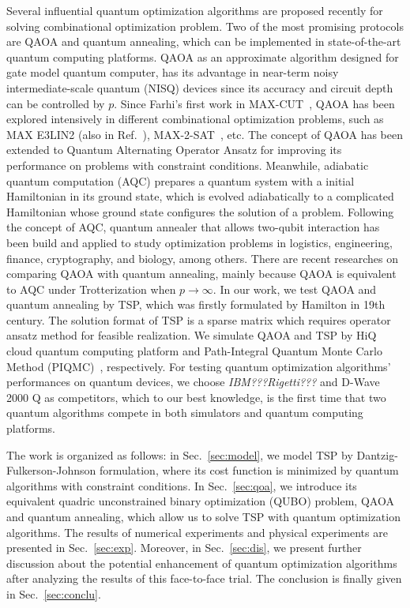 \documentclass[aps,pra,twocolumn,superscriptaddress]{revtex4-2}
\begin{document}
Several influential quantum optimization algorithms are proposed recently for solving combinational optimization problem. Two of the most promising protocols are QAOA and quantum annealing, which can be implemented in state-of-the-art quantum computing platforms. QAOA as an approximate algorithm designed for gate model quantum computer, has its advantage in near-term noisy intermediate-scale quantum (NISQ) devices since its accuracy and circuit depth can be controlled by $p$. Since Farhi's first work in MAX-CUT~\cite{maxcut}, QAOA has been explored intensively in different combinational optimization problems, such as MAX E3LIN2 (also in Ref.~\cite{maxcut}), MAX-2-SAT~\cite{max2sat}, etc. The concept of QAOA has been extended to Quantum Alternating Operator Ansatz for improving its performance on problems with constraint conditions. Meanwhile, adiabatic quantum computation (AQC) prepares a quantum system with a initial Hamiltonian in its ground state, which is evolved adiabatically to a complicated Hamiltonian whose ground state configures the solution of a problem. Following the concept of AQC, quantum annealer that allows two-qubit interaction has been build and applied to study optimization problems in logistics, engineering, finance, cryptography, and biology, among others. There are recent researches on comparing QAOA with quantum annealing, mainly because QAOA is equivalent to AQC under Trotterization when $p\rightarrow\infty$. In our work, we test QAOA and quantum annealing by TSP, which was firstly formulated by Hamilton in 19th century. The solution format of TSP is a sparse matrix which requires operator ansatz method for feasible realization. We simulate QAOA and TSP by HiQ cloud quantum computing platform and Path-Integral Quantum Monte Carlo Method (PIQMC)~\cite{path_integral}, respectively. For testing quantum optimization algorithms' performances on quantum devices, we choose \textit{IBM???Rigetti???} and D-Wave 2000 Q as competitors, which to our best knowledge, is the first time that two quantum algorithms compete in both simulators and quantum computing platforms.

The work is organized as follows: in Sec.~\ref{sec:model}, we model TSP by Dantzig-Fulkerson-Johnson formulation, where its cost function is minimized by quantum algorithms with constraint conditions. In Sec.~\ref{sec:qoa},  we introduce its equivalent quadric unconstrained binary optimization (QUBO) problem, QAOA and quantum annealing, which allow us to solve TSP with quantum optimization algorithms. The results of numerical experiments and physical experiments are presented in Sec.~\ref{sec:exp}. Moreover, in Sec.~\ref{sec:dis}, we present further discussion about the potential enhancement of quantum optimization algorithms after analyzing the results of this face-to-face trial. The conclusion is finally given in Sec.~\ref{sec:conclu}.
\end{document}
